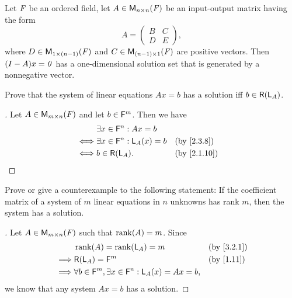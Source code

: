 \begin{thm}\label{3.12}
	Let \(\mathit{F}\) be an ordered field, let \(A \in \ms[n][n][\F]\) be an input-output matrix having the form
	\[
		A = \begin{pmatrix}
			B & C \\
			D & E
		\end{pmatrix},
	\]
	where \(D \in \ms[1][(n - 1)][\F]\) and \(C \in \ms[(n - 1)][1][\F]\) are positive vectors.
	Then \((I - A)x = \mathit{0}\) has a one-dimensional solution set that is generated by a nonnegative vector.
\end{thm}

\exercisesection

\setcounter{ex}{8}
\begin{ex}\label{ex:3.3.9}
	Prove that the system of linear equations \(Ax = b\) has a solution iff \(b \in \rg{\L_A}\).
\end{ex}

\begin{proof}[]
	Let \(A \in \MS\) and let \(b \in \mathsf{F}^m\).
	Then we have
	\begin{align*}
		     & \exists x \in \vs{F}^n : Ax = b                       \\
		\iff & \exists x \in \vs{F}^n : \L_A(x) = b &  & \by{2.3.8}  \\
		\iff & b \in \rg{\L_A}.                     &  & \by{2.1.10}
	\end{align*}
\end{proof}

\begin{ex}\label{ex:3.3.10}
	Prove or give a counterexample to the following statement:
	If the coefficient matrix of a system of \(m\) linear equations in \(n\) unknowns has rank \(m\), then the system has a solution.
\end{ex}

\begin{proof}[]
	Let \(A \in \MS\) such that \(\rk{A} = m\).
	Since
	\begin{align*}
		         & \rk{A} = \rk{\L_A} = m                                             &  & \by{3.2.1} \\
		\implies & \rg{\L_A} = \vs{F}^m                                               &  & \by{1.11}  \\
		\implies & \forall b \in \vs{F}^m, \exists x \in \vs{F}^n : \L_A(x) = Ax = b,
	\end{align*}
	we know that any system \(Ax = b\) has a solution.
\end{proof}
